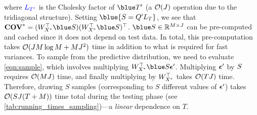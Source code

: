 where ${\color{blue} L_{T'} }$ is the Cholesky factor of $\blue \bT'$ (a $\bigo{J}$ operation due to the tridiagonal structure).
Setting $\blue{ \bS = \bQ' \bL_{\bT} }$, we see that $\Covtest = (\bW_{\bXtest}^\top {\blue \bS}) (\bW_{\bXtest}^\top {\blue \bS})^{\top}$.
${\blue S} \in \reals^{M \times J}$ can be pre-computed and cached since it does not depend on test data.
In total, this pre-computation takes $\bigo{J M \log M + M J^2}$ time in addition to what is required for fast variances.
To sample from the predictive distribution, we need to evaluate \cref{eqn:sample}, which involves multiplying $\bW^\top_{\bXtest} {\blue \bS} \bepsilon'$.
Multiplying $\boldsymbol{\epsilon}'$ by $S$ requires $\bigo{MJ}$ time, and finally multiplying by $W^{\top}_{X^*}$ takes $\bigo{TJ}$ time.
Therefore, drawing $S$ samples (corresponding to $S$ different values of $\boldsymbol{\epsilon}'$) takes $\bigo{SJ(T + M)}$ time total during the testing phase (see \cref{tab:running_times_sampling})---a \emph{linear} dependence on $T$.



